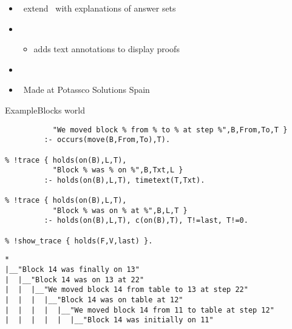 \begin{frame}{\xclingo}
  \begin{itemize}
  \item {} \ extend \clingo\ with explanations of answer sets
  \item {} \
    \begin{itemize}
    \item adds text annotations to display proofs
    \end{itemize}
  \item {} \ \cite{cafabr20a}
  \item {} \ Made at Potassco Solutions Spain
  \end{itemize}
\end{frame}
\begin{frame}[fragile,shrink]{Example}{Blocks world}
\begin{lstlisting}[language=clingo,commentstyle={\color{white}},basicstyle=\scriptsize\ttfamily]
% !trace { occurs(move(B,From,To),T),
           "We moved block % from % to % at step %",B,From,To,T }
         :- occurs(move(B,From,To),T).

% !trace { holds(on(B),L,T),
           "Block % was % on %",B,Txt,L }
         :- holds(on(B),L,T), timetext(T,Txt).

% !trace { holds(on(B),L,T),
           "Block % was on % at %",B,L,T }
         :- holds(on(B),L,T), c(on(B),T), T!=last, T!=0.

% !show_trace { holds(F,V,last) }.
\end{lstlisting}
\pause
\begin{lstlisting}[language=clingo,basicstyle=\scriptsize\ttfamily]
*
|__"Block 14 was finally on 13"
|  |__"Block 14 was on 13 at 22"
|  |  |__"We moved block 14 from table to 13 at step 22"
|  |  |  |__"Block 14 was on table at 12"
|  |  |  |  |__"We moved block 14 from 11 to table at step 12"
|  |  |  |  |  |__"Block 14 was initially on 11"
\end{lstlisting}
\end{frame}
%

